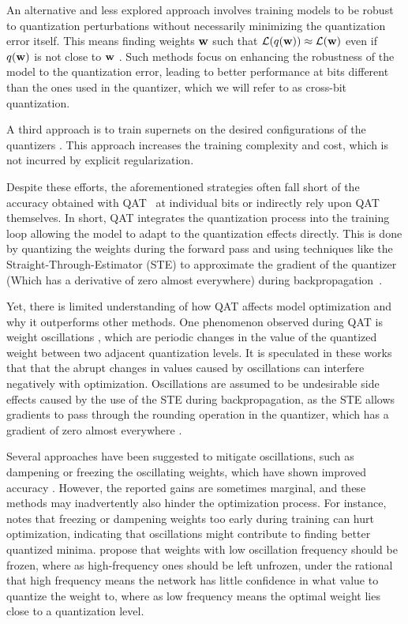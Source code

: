  
An alternative and less explored approach involves training models to be robust to quantization perturbations without necessarily minimizing the quantization error itself. This means finding weights \( \mathbf{w} \) such that \( \mathcal{L}(q(\mathbf{w})) \approx \mathcal{L}(\mathbf{w}) \) even if \( q(\mathbf{w}) \) is not close to \( \mathbf{w} \) \cite{alizadeh2020gradient, OneModelRobust}. Such methods focus on enhancing the robustness of the model to the quantization error, leading to better performance at bits different than the ones used in the quantizer, which we will refer to as cross-bit quantization.

A third approach is to train supernets on the desired configurations of the quantizers \cite{ijcai2022p504, Xu_2023_ICCV}. This approach increases the training complexity and cost, which is not incurred by explicit regularization. 

Despite these efforts, the aforementioned strategies often fall short of the accuracy obtained with QAT~\cite{jacob2017quantization} at individual bits or indirectly rely upon QAT themselves. In short, QAT integrates the quantization process into the training loop allowing the model to adapt to the quantization effects directly. This is done by quantizing the weights during the forward pass and using techniques like the Straight-Through-Estimator (STE) to approximate the gradient of the quantizer (Which has a derivative of zero almost everywhere) during backpropagation~\cite{bengio2013ste}.

Yet, there is limited understanding of how QAT affects model optimization and why it outperforms other methods. One phenomenon observed during QAT is weight oscillations \cite{pseudoQuantNoise, nagel2022overcoming}, which are periodic changes in the value of the quantized weight between two adjacent quantization levels. It is speculated in these works that that the abrupt changes in values caused by oscillations can interfere negatively with optimization. Oscillations are assumed to be undesirable side effects caused by the use of the STE during backpropagation, as the STE allows gradients to pass through the rounding operation in the quantizer, which has a gradient of zero almost everywhere \cite{pseudoQuantNoise, nagel2022overcoming}.

Several approaches have been suggested to mitigate oscillations, such as dampening or freezing the oscillating weights, which have shown improved accuracy \cite{nagel2022overcoming, gupta2023reducing}. However, the reported gains are sometimes marginal, and these methods may inadvertently also hinder the optimization process. For instance, \citet{nagel2022overcoming} notes that freezing or dampening weights too early during training can hurt optimization, indicating that oscillations might contribute to finding better quantized minima. \citet{vitoscillations} propose that weights with low oscillation frequency should be frozen, where as high-frequency ones should be left unfrozen, under the rational that high frequency means the network has little confidence in what value to quantize the weight to, where as low frequency means the optimal weight lies close to a quantization level.

